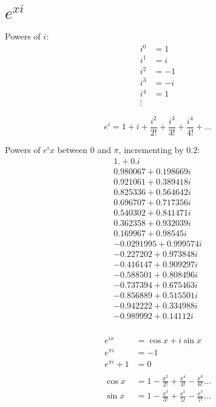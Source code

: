 \documentclass[letterpaper, landscape]{exam}
\begin{document}
  \newpage

  \section{$e^{xi}$} %
  
  Powers of $i$:
  \begin{align*}
    i^0 & = 1 \\
    i^1 & = i \\
    i^2 & = -1 \\
    i^3 & = -i \\
    i^4 & = 1 \\
    \vdots
  \end{align*}

  \[
    e^i = 1 + i + \frac{i^2}{2!} + \frac{i^3}{3!} + \frac{i^4}{4!} + \dots
  \]

  Powers of $e^ix$ between 0 and $\pi$, incrementing by $0.2$:
  \begin{align*}
    1. + 0. i \\
    0.980067 + 0.198669 i \\
    0.921061 + 0.389418 i \\
    0.825336 + 0.564642 i \\
    0.696707 + 0.717356 i \\
    0.540302 + 0.841471 i \\
    0.362358 + 0.932039 i \\
    0.169967 + 0.98545 i \\
    -0.0291995 + 0.999574 i \\
    -0.227202 + 0.973848 i \\
    -0.416147 + 0.909297 i \\
    -0.588501 + 0.808496 i \\
    -0.737394 + 0.675463 i \\
    -0.856889 + 0.515501 i \\
    -0.942222 + 0.334988 i \\
    -0.989992 + 0.14112 i \\
  \end{align*}

  \begin{align*}
    e^{ix}        & = \cos x + i \sin x \\
    e^{\pi i}     & = -1 \\
    e^{\pi i} + 1 & = 0 \\
    \\
    \cos x & = 1 - \frac{x^2}{2!} + \frac{x^4}{4!} - \frac{x^6}{6!} \dots \\
    \sin x & = 1 - \frac{x^3}{3!} + \frac{x^5}{5!} - \frac{x^7}{7!} \dots \\
  \end{align*}
\end{document}
